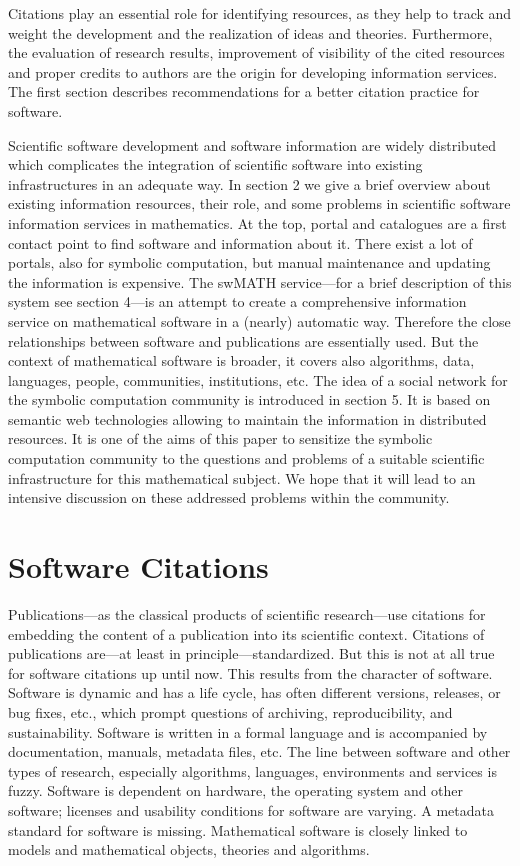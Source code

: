 \documentclass[12pt]{article}
\begin{document}
Citations play an essential role for identifying resources, as they help to track and weight the development and the realization of ideas and theories. Furthermore, the evaluation of research results, improvement of visibility of the cited resources and proper credits to authors are the origin for developing information services. The first section describes recommendations for a better citation practice for software.

Scientific software development and software information are widely distributed which complicates the integration of scientific software into existing infrastructures in an adequate way. In section 2 we give a brief overview about existing information resources, their \mbox{role}, and some problems in scientific software information services in mathematics. At the top, portal and catalogues are a first contact point to find software and information about it. There exist a lot of portals, also for symbolic computation, but manual maintenance and updating the information is expensive.  The swMATH service---for a brief description of this system see section 4---is an attempt to create a comprehensive information service  on mathematical software in a (nearly) automatic way. Therefore the close relationships between software and publications are essentially used.  But the context of mathematical software is broader, it covers also algorithms, data, languages, people, communities, institutions, etc.  The idea of a social network for the symbolic computation community is introduced in section 5. It is based on semantic web technologies allowing to maintain the information in distributed resources. It is one of the aims of this paper to sensitize  the symbolic computation community to the questions and problems of a suitable scientific infrastructure for this mathematical subject. We hope that it will lead to an intensive discussion on these addressed problems within the community.


\section{Software Citations}

Publications---as the classical products of scientific research---use citations for embedding the content of a publication into its scientific context. Citations of publications are---at least in principle---standardized. But this is not at all true for software citations up until now. This results from the character of software. Software is dynamic and has a life cycle, has often different versions, releases, or bug fixes, etc., which prompt questions of archiving, reproducibility, and sustainability.  Software is written in a formal language and is accompanied by documentation, manuals, metadata files, etc. The line between software and other types of research, especially algorithms, languages, environments and services is fuzzy. Software is dependent on hardware, the operating system and other software; licenses and usability conditions for software are varying. A metadata standard for software is missing. Mathematical software is closely linked to models and mathematical objects, theories and algorithms.
\end{document}
